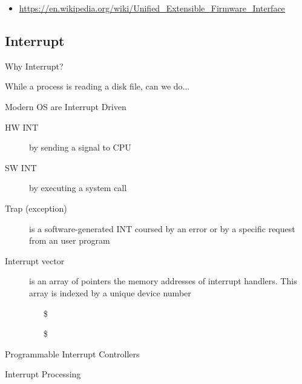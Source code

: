 \begin{itemize}
\item \url{https://en.wikipedia.org/wiki/Unified_Extensible_Firmware_Interface}
\end{itemize}

\subsection{Interrupt}
\label{sec:interrupt}

\begin{frame}{Why Interrupt?}
  \begin{iblock}{While a process is reading a disk file, can we do...}
    \begin{center}
    \end{center}
  \end{iblock}
\end{frame}

\begin{frame}{Modern OS are Interrupt Driven}
  \begin{description}
  \item[HW INT] by sending a signal to CPU
  \item[SW INT] by executing a \alert{system call}
  \item[Trap (exception)] is a software-generated INT coursed by an error or by a
    specific request from an user program
  \item[Interrupt vector] is an array of pointers {\pright} the memory addresses
    of \alert{interrupt handlers}. This array is indexed by a unique device number
    \begin{itemize}
    \item[\$] 
    \item[\$] 
    \end{itemize}
  \end{description}
\end{frame}

\begin{frame}{Programmable Interrupt Controllers}
  \centering
  \mode<beamer>{ \texttt{[image: int-osdi-34]}}%
\end{frame}

\begin{frame}{Interrupt Processing}
  \begin{center}
     
  \end{center}
\end{frame}

